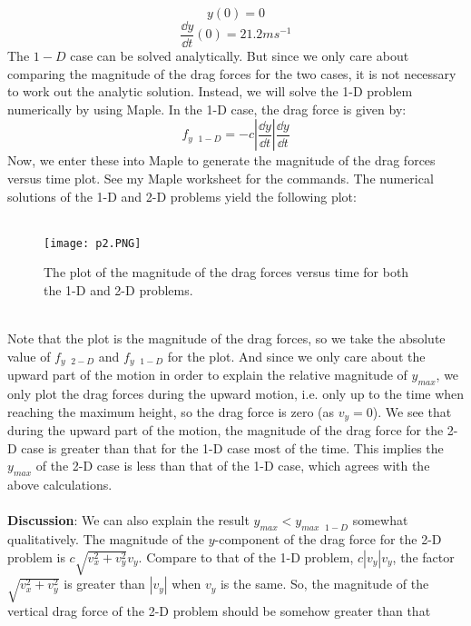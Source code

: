 \documentclass{article}
\begin{document}
\begin{enumerate}
  \begin{equation}
    y(0)=0
  \end{equation}
  \begin{equation}
    \frac{\dd y}{\dd t}(0) = 21.2 ms^{-1}
  \end{equation}
  The \(1-D\) case can be solved analytically. But since we only care about comparing the magnitude of the drag forces for the two cases, it is not necessary to work out the analytic solution. Instead, we will solve the 1-D problem numerically by using Maple.
  In the 1-D case, the drag force is given by:
  \begin{equation}
    f_{y\text{ }1-D} =  -c\left|\frac{\dd y}{\dd t}\right| \frac{\dd y}{\dd t}
  \end{equation}
  Now, we enter these into Maple to generate the magnitude of the drag forces versus time plot. See my Maple worksheet for the commands. The numerical solutions of the 1-D and 2-D problems yield the following plot:
  \pagebreak \\ \\
  \begin{figure}[ht]
      \centering
      \texttt{[image: p2.PNG]}
      \caption{The plot of the magnitude of the drag forces versus time for both the 1-D and 2-D problems. }
      \label{fig:label}
  \end{figure}\\
  Note that the plot is the magnitude of the drag forces, so we take the absolute value of \(f_{y\text{ }2-D}\) and
  \(f_{y\text{ }1-D}\) for the plot. And since we only care about the upward part of the motion in order to explain
  the relative magnitude of \(y_{max}\), we only plot the drag forces during the upward motion, i.e. only up to the time when
  reaching the maximum height, so the drag force is zero (as \(v_y =0\)). We see that during the upward part of the motion, the magnitude of the drag force for the 2-D case is greater than that for the 1-D case most of the time. This implies the \(y_{max}\) of the 2-D case is less than that of the 1-D case, which agrees with the above calculations.\\
  \\
  \textbf{Discussion}: We can also explain the result \(y_{max}<y_{max\text{ }1-D}\) somewhat qualitatively.
  The magnitude of the \(y\)-component of the drag force for the 2-D problem is \(c\sqrt{v_{x}^2 +v_y^2} v_y\).
  Compare to that of the 1-D problem, \(c|v_y| v_y\), the factor \(\sqrt{v_{x}^2 +v_y^2}\) is greater than \(|v_y|\)
  when \(v_y\) is the same. So, the magnitude of the vertical drag force of the 2-D problem should be somehow greater than that

\end{enumerate}
\end{document}

